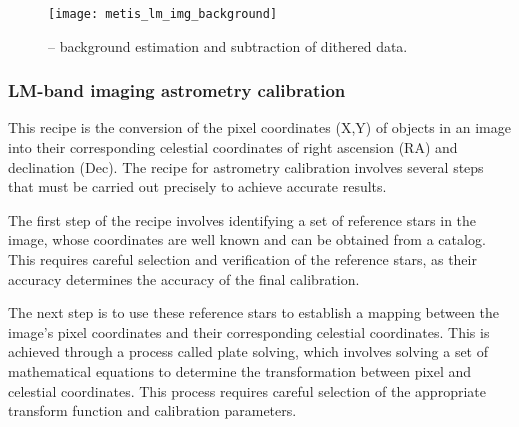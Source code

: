 \begin{figure}[hb]
  \centering
  \texttt{[image: metis\_lm\_img\_background]}
  \caption[Recipe: ]{ --
    background estimation and subtraction of dithered  data.}
  \label{fig:metis_lm_img_background}
\end{figure}


\clearpage

\subsubsection{LM-band imaging astrometry calibration}
\label{lm_img_astrometry_calib}
\label{rec:lm_img_astrometry_calib}
\label{sssec:lm_img_astrometry_calib}
\label{metis_lm_img_astrometry_process}
\label{rec:metis_lm_img_astrometry_process}
\label{sssec:metis_lm_img_astrometry_process}
This recipe is the conversion of the pixel coordinates (X,Y) of objects in an image
into their corresponding celestial coordinates of right ascension (RA) and 
declination (Dec). The recipe for astrometry calibration involves several 
steps that must be carried out precisely to achieve accurate results.

The first step of the recipe involves identifying a set of reference stars 
in the image, whose coordinates are well known and can be obtained from a 
catalog. This requires careful selection and verification of the reference stars, 
as their accuracy determines the accuracy of the final calibration.

The next step is to use these reference stars to establish a mapping between 
the image's pixel coordinates and their corresponding celestial coordinates. This 
is achieved through a process called plate solving, which involves solving a set 
of mathematical equations to determine the transformation between pixel and celestial 
coordinates. This process requires careful selection of the appropriate transform function 
and calibration parameters.

